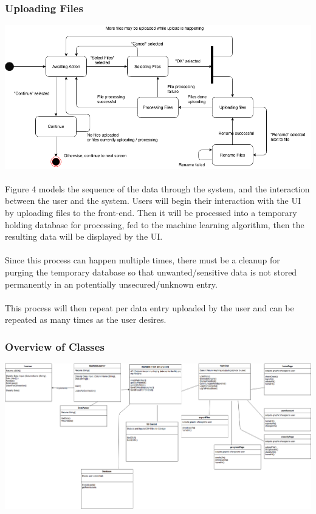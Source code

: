 \documentclass[12pt,oneside,letterpaper]{article}
\begin{document}
\subsubsection{Uploading Files}
\includegraphics[scale = 0.52]{spencer_state.png}
\begingroup
{}
\endgroup


\paragraph{}Figure 4 models the sequence of the data through the system, and the interaction between the user and the system. Users will begin their interaction with the UI by uploading files to the front-end. Then it will be processed into a temporary holding database for processing, fed to the machine learning algorithm, then the resulting data will be displayed by the UI.
\paragraph{} Since this process can happen multiple times, there must be a cleanup for purging the temporary database so that unwanted/sensitive data is not stored permanently in an potentially unsecured/unknown entry.
\paragraph{} This process will then repeat per data entry uploaded by the user and can be repeated as many times as the user desires.

\subsubsection{Overview of Classes}
\includegraphics[scale = 0.3]{YarmClassDiagram.png}
\begingroup
{}
\endgroup
\end{document}
